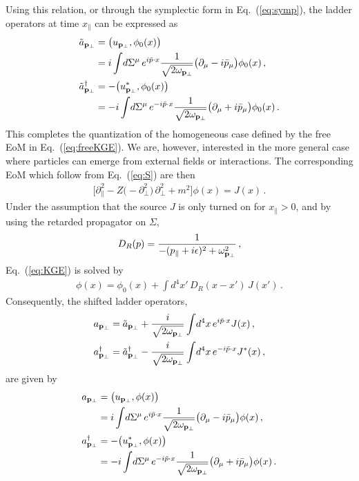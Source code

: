 \documentclass[reprint,superscriptaddress,english,preprintnumbers,amsmath,amssymb,aps,prx]{revtex4-2}
\def\Eq#1{Eq.~(\ref{#1})}
\begin{document}
Using this relation, or through the symplectic form in \Eq{eq:symp}, the ladder operators at time $x_\parallel$ can be expressed as
\begin{align}
\begin{split}
\tilde a_{\bold{p}_\perp} &= \big( u_{\bold{p}_\perp}, \phi_0(x) \big)\\
 &= i \int\!d\Sigma^\mu\, e^{i\bar p \cdot x} \frac{1}{\sqrt{2\omega_{\bold{p}_\perp}}} \big( \partial_\mu - i \bar p_\mu \big) \phi_0(x)\,,\\
\tilde a_{\bold{p}_\perp}^\dagger &= -\big( u_{\bold{p}_\perp}^*, \phi_0(x) \big)\\
 &= -i \int\!d\Sigma^\mu\, e^{-i\bar p \cdot x} \frac{1}{\sqrt{2\omega_{\bold{p}_\perp}}} \big( \partial_\mu + i \bar p_\mu \big) \phi_0(x)\,.
\end{split}
\end{align}
This completes the quantization of the homogeneous case defined by the free EoM in \Eq{eq:freeKGE}. We are, however, interested in the more general case where particles can emerge from  external fields or interactions. The corresponding EoM which follow from \Eq{eq:S} are then
\begin{align}\label{eq:KGE}
\Big[ \partial_\parallel^2 - Z\big(-\partial_\perp^2\big)\, 
\partial_\perp^2 + m^2  \Big] \phi(x) = J(x)\,.
\end{align}
Under the assumption that the source $J$ is only turned on for 
$x_\parallel >0$, and by using the retarded propagator on $\Sigma$,
\begin{align}\label{eq:DR}
D_R(p) = \frac{1}{-(p_\parallel+i\epsilon)^2 + \omega_{\bold{p}_\perp}^2}\,,
\end{align}
\Eq{eq:KGE} is solved by
\begin{align}
\phi(x) = \phi_0(x) + \int\!d^4x'\, D_R(x-x')\, J(x')\,.
\end{align}
Consequently, the shifted ladder operators,
\begin{align}
\begin{split}
a_{\bold{p}_\perp} &= \tilde a_{\bold{p}_\perp} + \frac{i}{\sqrt{2\omega_{\bold{p}_\perp}}} \int\!d^4x\,e^{i\bar p \cdot x}J(x)\,,\\
a_{\bold{p}_\perp}^\dagger &= \tilde a_{\bold{p}_\perp}^\dagger - \frac{i}{\sqrt{2\omega_{\bold{p}_\perp}}} \int\!d^4x\,e^{-i\bar p \cdot x}J^*(x)\,,
\end{split}
\end{align}
are given by
\begin{align}\label{eq:ladder}
\begin{split}
a_{\bold{p}_\perp} &= \big( u_{\bold{p}_\perp}, \phi(x) \big)\\
 &= i \int\!d\Sigma^\mu\, e^{i\bar p \cdot x} \frac{1}{\sqrt{2\omega_{\bold{p}_\perp}}} \big( \partial_\mu - i \bar p_\mu \big) \phi(x)\,,\\
a_{\bold{p}_\perp}^\dagger &= -\big( u_{\bold{p}_\perp}^*, \phi(x) \big)\\
 &= -i \int\!d\Sigma^\mu\, e^{-i\bar p \cdot x} \frac{1}{\sqrt{2\omega_{\bold{p}_\perp}}} \big( \partial_\mu + i \bar p_\mu \big) \phi(x)\,.
\end{split}
\end{align}
\end{document}
